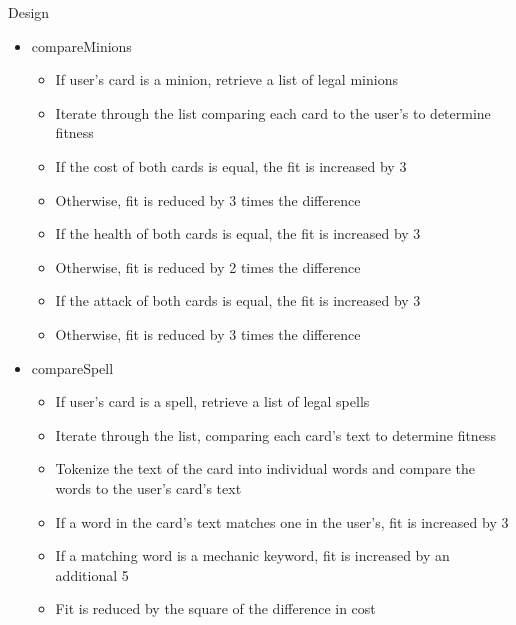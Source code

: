 \documentclass[aspectratio=169]{beamer}
\begin{document}
\begin{frame}[allowframebreaks]{Design}
\begin{itemize}
\item compareMinions
\begin{itemize}
\item If user's card is a minion, retrieve a list of legal minions
\item Iterate through the list comparing each card to the user's to determine fitness
\item If the cost of both cards is equal, the fit is increased by 3
\item Otherwise, fit is reduced by 3 times the difference
\item If the health of both cards is equal, the fit is increased by 3
\item Otherwise, fit is reduced by 2 times the difference
\item If the attack of both cards is equal, the fit is increased by 3
\item Otherwise, fit is reduced by 3 times the difference
\end{itemize}

\pagebreak
\item compareSpell
\begin{itemize}
\item If user's card is a spell, retrieve a list of legal spells
\item Iterate through the list, comparing each card's text to determine fitness
\item Tokenize the text of the card into individual words and compare the words
to the user's card's text
\item If a word in the card's text matches one in the user's, fit is increased by 3
\item If a matching word is a mechanic keyword, fit is increased by an additional 5
\item Fit is reduced by the square of the difference in cost
\end{itemize}


\end{itemize}
\end{frame}
\end{document}
